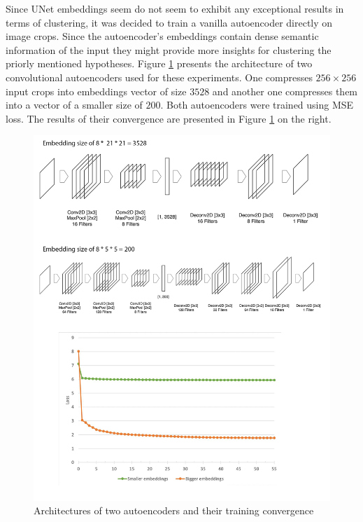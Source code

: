 Since UNet embeddings seem do not seem to exhibit any exceptional results in terms of clustering, it was decided to train a vanilla autoencoder directly on image crops. Since the autoencoder's embeddings contain dense semantic information of the input they might provide more insights for clustering the priorly mentioned hypotheses. Figure \ref{fig:ae-training} presents the architecture of two convolutional autoencoders used for these experiments. One compresses $256 \times 256$ input crops into embeddings vector of size $3528$ and another one compresses them into a vector of a smaller size of $200$. Both autoencoders were trained using MSE loss. The results of their convergence are presented in Figure \ref{fig:ae-training} on the right.

\begin{figure}[H]
	\begin{center}
		\includegraphics[width=\linewidth]{bilder/ae-embeddings/training-architectures.png}
		\caption{Architectures of two autoencoders and their training convergence}\label{fig:ae-training}
	\end{center}
\end{figure}

